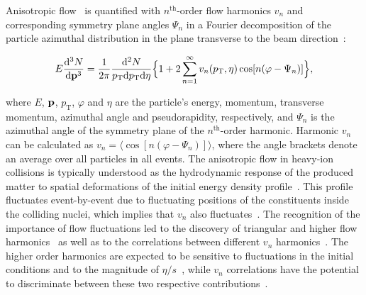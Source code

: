 Anisotropic flow~\cite{Ollitrault:1992bk} is quantified with $n^{\mathrm{th}}$-order flow harmonics $v_n$ and corresponding symmetry plane angles $\Psi_n$ in a Fourier decomposition of the particle azimuthal distribution in the plane transverse to the beam direction~\cite{Voloshin:1994mz,Poskanzer:1998yz}:

\begin{equation}
E\frac{\mathrm{d}^3N}{\mathrm{d}\bold{p}^3} = \frac{1}{2\pi}\frac{\mathrm{d}^2N}{p_{\mathrm{T}}\mathrm{d}p_{\mathrm{T}}\mathrm{d}\eta} \Big\{1 + 2\sum_{n=1}^{\infty} v_n(p_{\mathrm{T}},\eta) \cos[n(\varphi - \Psi_n)]\Big\},
\label{Eq:Fourier}
\end{equation}

\noindent where $E$, $\bold{p}$, $p_{\mathrm{T}}$, $\varphi$ and $\eta$ are the particle's energy, momentum, transverse momentum, azimuthal angle and pseudorapidity, respectively, and $\Psi_n$ is the azimuthal angle of the symmetry plane of the $n^{\mathrm{th}}$-order harmonic. Harmonic $v_n$ can be calculated as $v_{n} = \langle{\cos[n(\varphi - \Psi_n)]}\rangle$, where the angle brackets denote an average over all particles in all events.
The anisotropic flow in heavy-ion collisions is typically understood as the hydrodynamic response of the produced matter to spatial deformations of the initial energy density profile~\cite{Floerchinger:2013tya}.
This profile fluctuates event-by-event due to fluctuating positions of the constituents inside the colliding nuclei, which implies that $v_n$ also fluctuates~\cite{Miller:2003kd,Alver:2006wh}.
The recognition of the importance of flow fluctuations led to the discovery of triangular and higher flow harmonics~\cite{Alver:2010gr,ALICE:2011ab} as well as to the correlations between different $v_{n}$ harmonics~\cite{Niemi:2012aj,Aad:2014fla}.
The higher order harmonics are expected to be sensitive to fluctuations in the initial conditions and to the magnitude of $\eta/s$~\cite{Alver:2010dn,Luzum:2012wu}, while $v_{n}$ correlations have the potential to discriminate between these two respective contributions~\cite{Niemi:2012aj}.

